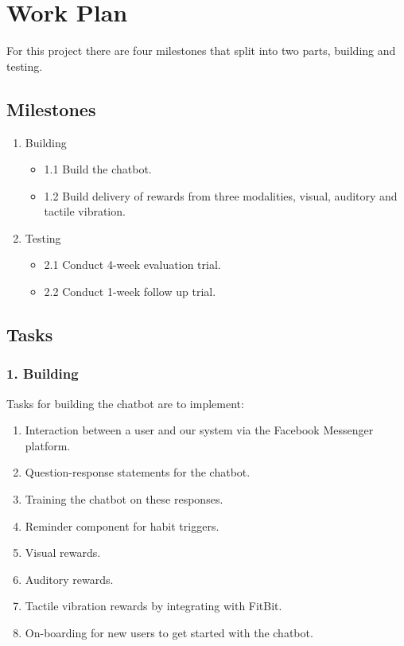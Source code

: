 
\newpage
\section{Work Plan}
For this project there are four milestones that split into two parts, building and testing.


\subsection{Milestones}

\begin{enumerate}
  \item Building
  \begin{itemize}
    \item 1.1 Build the chatbot.
    \item 1.2 Build delivery of rewards from three modalities, visual, auditory and tactile vibration.
  \end{itemize}
  \item Testing
  \begin{itemize}
    \item 2.1 Conduct 4-week evaluation trial.
    \item 2.2 Conduct 1-week follow up trial.
  \end{itemize}
\end{enumerate}

\subsection{Tasks}

\subsubsection*{1. Building}
Tasks for building the chatbot are to implement:

\begin{enumerate}
  \item Interaction between a user and our system via the Facebook Messenger platform.
  \item Question-response statements for the chatbot.
  \item Training the chatbot on these responses.
  \item Reminder component for habit triggers.
  \item Visual rewards.
  \item Auditory rewards.
  \item Tactile vibration rewards by integrating with FitBit.
  \item On-boarding for new users to get started with the chatbot.
\end{enumerate}


